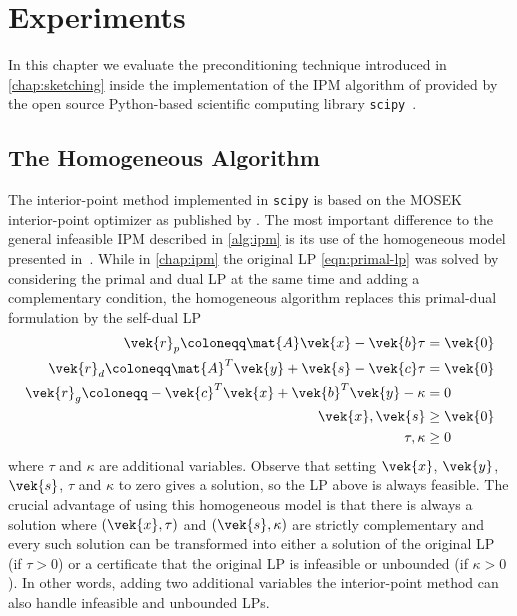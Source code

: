 \chapter{Experiments}\label{chap:experiments}

In this chapter we evaluate the preconditioning technique introduced in \cref{chap:sketching} inside the implementation of the IPM algorithm of \textcite{AndersenAndersen-MosekInteriorPointMethod} provided by the open source Python-based scientific computing library \texttt{scipy}~\cite{Scipy}.

\section{The Homogeneous Algorithm}

The interior-point method implemented in \texttt{scipy} is based on the MOSEK interior-point optimizer as published by \textcite{AndersenAndersen-MosekInteriorPointMethod}.
The most important difference to the general infeasible IPM described in \cref{alg:ipm} is its use of the homogeneous model presented in~\cite{XuHungYe-SimplifiedHomogeneousAlgorithm}.
While in \cref{chap:ipm} the original LP \cref{eqn:primal-lp} was solved by considering the primal and dual LP at the same time and adding a complementary condition, the homogeneous algorithm replaces this primal-dual formulation by the self-dual LP
\begin{subequations}
  \begin{align}
    \vek{r}_p \coloneqq \mat{A}\vek{x} - \vek{b} \tau &= \vek{0} \\
    \vek{r}_d \coloneqq \mat{A}^T \vek{y} + \vek{s} - \vek{c}\tau &= \vek{0} \\
    \vek{r}_g \coloneqq - \vek{c}^T\vek{x} + \vek{b}^T\vek{y} - \kappa &= 0 \\
    \vek{x}, \vek{s} &\geq \vek{0} \\
    \tau, \kappa &\geq 0
  \end{align}
\end{subequations}
where \(\tau\) and \(\kappa\) are additional variables.
Observe that setting \(\vek{x}\), \(\vek{y}\), \(\vek{s}\), \(\tau\) and \(\kappa\) to zero gives a solution, so the LP above is always feasible.
The crucial advantage of using this homogeneous model is that there is always a solution where \((\vek{x}, \tau)\) and \((\vek{s}, \kappa)\) are strictly complementary and every such solution can be transformed into either a solution of the original LP (if \(\tau > 0\)) or a certificate that the original LP is infeasible or unbounded (if \(\kappa > 0\)).
In other words, adding two additional variables the interior-point method can also handle infeasible and unbounded LPs.

